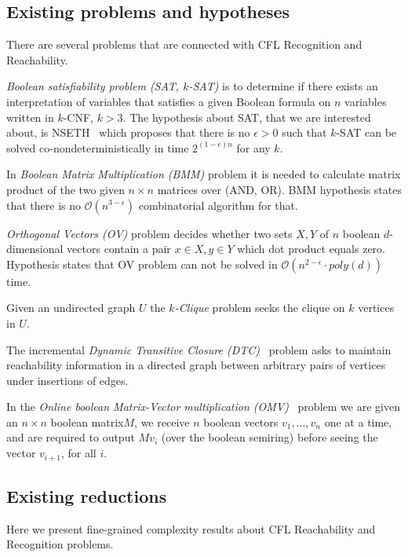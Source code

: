 \documentclass[acmsmall,review,nonacm]{acmart}\settopmatter{printfolios=true,printccs=false,printacmref=false}
\begin{document}
	\subsection{Existing problems and hypotheses}
	
	There are several problems that are connected with CFL Recognition and Reachability. 
	
	\emph{Boolean satisfiability problem (SAT, $k$-SAT)} is to determine if there exists an interpretation of variables that satisfies a given Boolean formula on $n$ variables written in $k$-CNF, $k > 3$. The hypothesis about SAT, that we are interested about, is NSETH~\cite{10.1145/2840728.2840746} which proposes that there is no $\epsilon > 0$ such that $k$-SAT can be solved co-nondeterministically in time $2^{(1 - \epsilon) n}$ for any $k$.
	
	In \emph{Boolean Matrix Multiplication (BMM)} problem it is needed to calculate matrix product of the two given $n \times n$ matrices over (AND, OR). BMM hypothesis states that there is no $\mathcal{O}(n^{3 - \epsilon})$ combinatorial algorithm for that. 
	
	\emph{Orthogonal Vectors (OV)} problem decides whether two sets $X, Y$ of $n$ boolean $d$-dimensional vectors contain a pair $x \in X, y \in Y$ which dot product equals zero. Hypothesis states that OV problem can not be solved in $\mathcal{O}(n^{2 - \epsilon} \cdot poly(d))$ time. 
	
	Given an undirected graph $U$ the \emph{$k$-Clique} problem seeks the clique on $k$ vertices in $U$. 
	
	The incremental \emph{Dynamic Transitive Closure (DTC)}~\cite{Hanauer2020FasterFD} problem asks to maintain reachability information in a directed graph between arbitrary pairs of vertices under insertions of edges.
	
	In the \emph{Online boolean Matrix-Vector multiplication (OMV)}~\cite{10.5555/3039686.3039828} problem we are given an $n \times n$ boolean matrix$M$, we receive $n$ boolean vectors $v_1, \ldots, v_n$ one at a time, and are required to output $Mv_i$ (over the boolean semiring) before seeing the vector $v_{i+1}$, for all $i$.
	
	\subsection{Existing reductions}
	
	Here we present fine-grained complexity results about CFL Reachability and Recognition problems.
	
\end{document}

